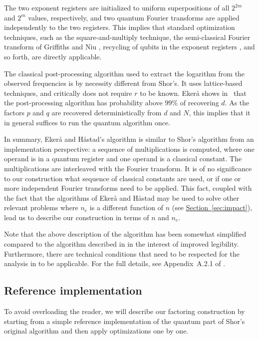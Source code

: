 \documentclass[a4paper, onecolumn, accepted=2021-03-29]{quantumarticle}
\renewcommand{\sec}[1]{\hyperref[sec:#1]{Section~\ref*{sec:#1}}}
\begin{document}
The two exponent registers are initialized to uniform superpositions of all $2^{2m}$ and $2^{m}$ values, respectively, and two quantum Fourier transforms are applied independently to the two registers.
This implies that standard optimization techniques, such as the square-and-multiply technique, the semi-classical Fourier transform of Griffiths and Niu \cite{griffiths1996semiclassical}, recycling of qubits in the exponent registers \cite{mosca1999recycle, parker2000recycle}, and so forth, are directly applicable.

The classical post-processing algorithm used to extract the logarithm from the observed frequencies is by necessity different from Shor's.
It uses lattice-based techniques, and critically does not require $r$ to be known.
Ekerå shows in~\cite{ekeraa2017pp} that the post-processing algorithm has probability above $99\%$ of recovering $d$.
As the factors $p$ and $q$ are recovered deterministically from $d$ and $N$, this implies that it in general suffices to run the quantum algorithm once.

In summary, Ekerå and Håstad's algorithm is similar to Shor's algorithm from an implementation perspective:
a sequence of multiplications is computed, where one operand is in a quantum register and one operand is a classical constant.
The multiplications are interleaved with the Fourier transform.
It is of no significance to our construction what sequence of classical constants are used, or if one or more independent Fourier transforms need to be applied.
This fact, coupled with the fact that the algorithms of Ekerå and Håstad may be used to solve other relevant problems where $n_e$ is a different function of $n$ (see \sec{impact}), lead us to describe our construction in terms of $n$ and $n_e$.

Note that the above description of the algorithm has been somewhat simplified compared to the algorithm described in \cite{ekeraa2017quantum, ekeraa2017pp} in the interest of improved legibility.
Furthermore, there are technical conditions that need to be respected for the analysis in \cite{ekeraa2017pp} to be applicable.
For the full details, see Appendix~A.2.1 of \cite{ekeraa2017pp}.

\subsection{Reference implementation}

To avoid overloading the reader, we will describe our factoring construction by starting from a simple reference implementation of the quantum part of Shor's original algorithm and then apply optimizations one by one.
\end{document}
